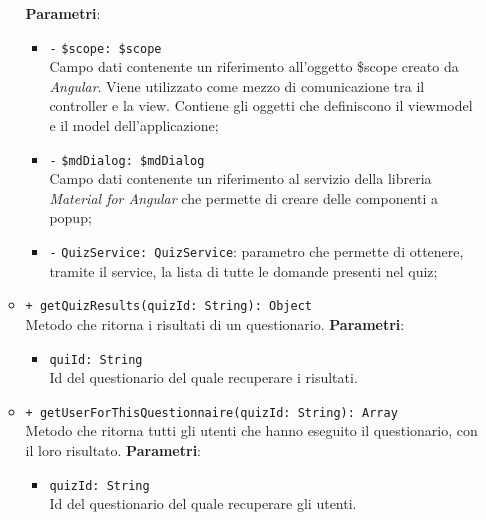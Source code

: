 \begin{itemize}
\begin{itemize}
		\textbf{Parametri}: 
		\begin{itemize}
			\item \texttt{-} \texttt{\$scope: \$scope} \\
			Campo dati contenente un riferimento all’oggetto \$scope creato da \textit{Angular}. Viene utilizzato come mezzo di comunicazione tra il controller e la view. Contiene gli oggetti che definiscono il viewmodel e il model dell’applicazione;
			\item \texttt{-} \texttt{\$mdDialog: \$mdDialog} \\
			Campo dati contenente un riferimento al servizio della libreria \textit{Material for Angular} che permette di creare delle componenti a popup;
			\item \texttt{-} \texttt{QuizService: QuizService}: parametro che permette di ottenere, tramite il service, la lista di tutte le domande presenti nel quiz;
		\end{itemize}
		\item \texttt{+ getQuizResults(quizId: String): Object} \\ Metodo che ritorna i risultati di un questionario.
		\textbf{Parametri}:
		\begin{itemize}
			\item \texttt{quiId: String} \\ Id del questionario del quale recuperare i risultati.
		\end{itemize}
		\item \texttt{+ getUserForThisQuestionnaire(quizId: String): Array} \\ Metodo che ritorna tutti gli utenti che hanno eseguito il questionario, con il loro risultato.
		\textbf{Parametri}:
		\begin{itemize}
			\item \texttt{quizId: String} \\ Id del questionario del quale recuperare gli utenti.
		\end{itemize}
	\end{itemize}
\end{itemize}

